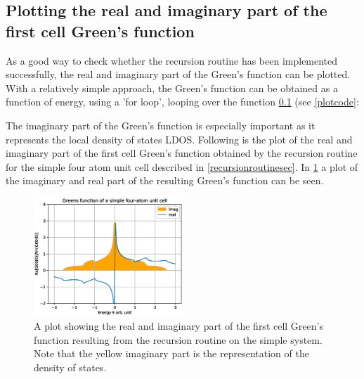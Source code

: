 \subsection{Plotting the real and imaginary part of the first cell Green's function}
As a good way to check whether the recursion routine has been implemented successfully, the real and imaginary part of the Green's function can be plotted. With a relatively simple approach, the Green's function can be obtained as a function of energy, using a 'for loop', looping over the function \cref{} (see \cref{plotcode}:
\begin{listing}[ht]
    \caption{}
    \label{plotcode}
\end{listing}
The imaginary part of the Green's function is especially important as it represents the local density of states LDOS. Following is the plot of the real and imaginary part of the first cell Green's function obtained by the recursion routine for the simple four atom unit cell described in \cref{recursionroutinesec}. In \cref{imrealplot} a plot of the imaginary and real part of the resulting Green's function can be seen. 
\begin{figure}
    \centering
    \includegraphics[width = 0.5\textwidth]{Figures/imrealplot.eps}
    \caption{A plot showing the real and imaginary part of the first cell Green's function resulting from the recursion routine on the simple system. Note that the yellow imaginary part is the representation of the density of states.}
    \label{imrealplot}
\end{figure}
